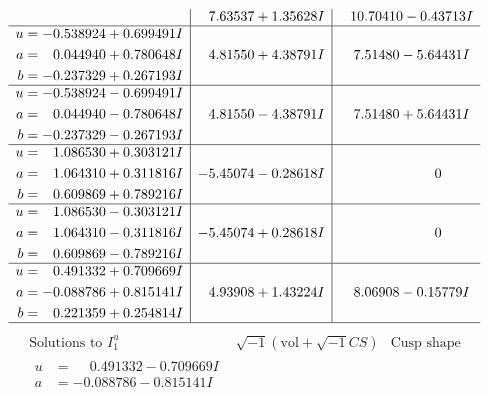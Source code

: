 \documentclass[1p]{elsarticle_modified}
\theoremstyle{definition}
\newcommand{\I}{\sqrt{-1}}
\begin{document}
$$\begin{array}{c|c|c}
 & \phantom{-}7.63537 + 1.35628 I & \phantom{-}10.70410 - 0.43713 I \\ \hline\begin{aligned}
u &= -0.538924 + 0.699491 I \\
a &= \phantom{-}0.044940 + 0.780648 I \\
b &= -0.237329 + 0.267193 I\end{aligned}
 & \phantom{-}4.81550 + 4.38791 I & \phantom{-}7.51480 - 5.64431 I \\ \hline\begin{aligned}
u &= -0.538924 - 0.699491 I \\
a &= \phantom{-}0.044940 - 0.780648 I \\
b &= -0.237329 - 0.267193 I\end{aligned}
 & \phantom{-}4.81550 - 4.38791 I & \phantom{-}7.51480 + 5.64431 I \\ \hline\begin{aligned}
u &= \phantom{-}1.086530 + 0.303121 I \\
a &= \phantom{-}1.064310 + 0.311816 I \\
b &= \phantom{-}0.609869 + 0.789216 I\end{aligned}
 & -5.45074 - 0.28618 I & \phantom{-0.000000 } 0 \\ \hline\begin{aligned}
u &= \phantom{-}1.086530 - 0.303121 I \\
a &= \phantom{-}1.064310 - 0.311816 I \\
b &= \phantom{-}0.609869 - 0.789216 I\end{aligned}
 & -5.45074 + 0.28618 I & \phantom{-0.000000 } 0 \\ \hline\begin{aligned}
u &= \phantom{-}0.491332 + 0.709669 I \\
a &= -0.088786 + 0.815141 I \\
b &= \phantom{-}0.221359 + 0.254814 I\end{aligned}
 & \phantom{-}4.93908 + 1.43224 I & \phantom{-}8.06908 - 0.15779 I\\
 \hline 
 \end{array}$$\newpage$$\begin{array}{c|c|c}  
\text{Solutions to }I^u_{1}& \I (\text{vol} + \sqrt{-1}CS) & \text{Cusp shape}\\
 \hline 
\begin{aligned}
u &= \phantom{-}0.491332 - 0.709669 I \\
a &= -0.088786 - 0.815141 I \\

\end{aligned}
\end{array}$$
\end{document}
